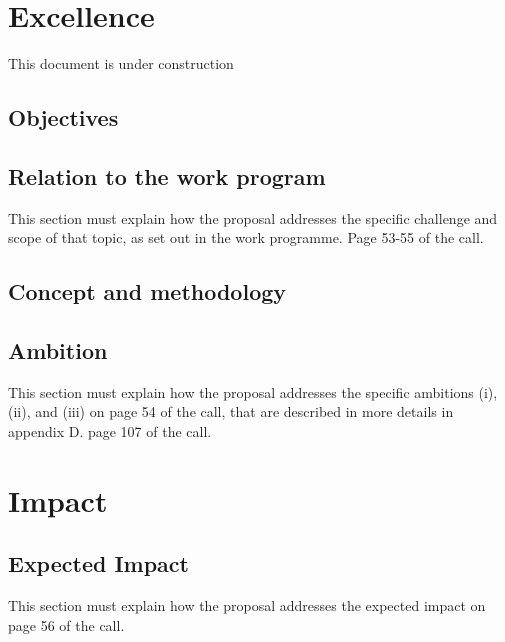 \documentclass[12pt]{book}
\begin{document}
\chapter{Excellence}

{\Huge \color{red} This document is under construction}



\section{Objectives}



\section{Relation to the work program}

{\color{red} This section must explain how the proposal addresses the
  specific challenge and scope of that topic, as set out in the work
  programme. Page 53-55 of the call.}



\section{Concept and methodology}



\section{Ambition}

{\color{red} This section must explain how the proposal addresses the
  specific ambitions (i), (ii), and (iii) on page 54 of the call, that are
  described in more details in appendix D. page 107 of the call.}



\chapter{Impact}

\section{Expected Impact}

{\color{red} This section must explain how the proposal addresses the
  expected impact on page 56 of the call.}
\end{document}
